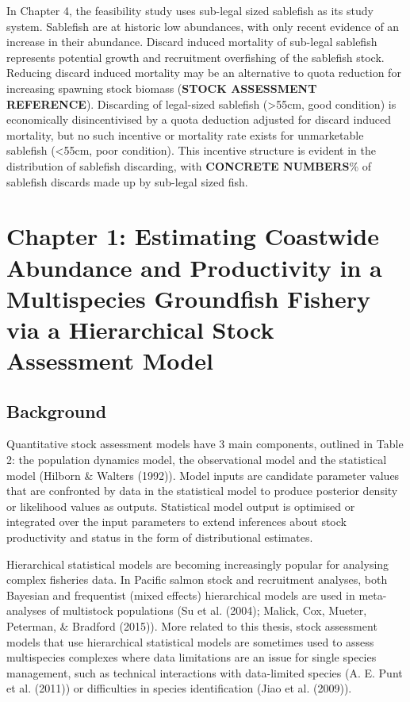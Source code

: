 \documentclass[12pt,]{scrartcl}
\begin{document}
In Chapter 4, the feasibility study uses sub-legal sized sablefish as
its study system. Sablefish are at historic low abundances, with only
recent evidence of an increase in their abundance. Discard induced
mortality of sub-legal sablefish represents potential growth and
recruitment overfishing of the sablefish stock. Reducing discard induced
mortality may be an alternative to quota reduction for increasing
spawning stock biomass (\textbf{STOCK ASSESSMENT REFERENCE}). Discarding
of legal-sized sablefish (\textgreater{}55cm, good condition) is
economically disincentivised by a quota deduction adjusted for discard
induced mortality, but no such incentive or mortality rate exists for
unmarketable sablefish (\textless{}55cm, poor condition). This incentive
structure is evident in the distribution of sablefish discarding, with
\textbf{CONCRETE NUMBERS}\% of sablefish discards made up by sub-legal
sized fish.

\section{Chapter 1: Estimating Coastwide Abundance and Productivity in a
Multispecies Groundfish Fishery via a Hierarchical Stock Assessment
Model}\label{chapter-1-estimating-coastwide-abundance-and-productivity-in-a-multispecies-groundfish-fishery-via-a-hierarchical-stock-assessment-model}

\subsection{Background}\label{background-1}

Quantitative stock assessment models have 3 main components, outlined in
Table 2: the population dynamics model, the observational model and the
statistical model (Hilborn \& Walters (1992)). Model inputs are
candidate parameter values that are confronted by data in the
statistical model to produce posterior density or likelihood values as
outputs. Statistical model output is optimised or integrated over the
input parameters to extend inferences about stock productivity and
status in the form of distributional estimates.

Hierarchical statistical models are becoming increasingly popular for
analysing complex fisheries data. In Pacific salmon stock and
recruitment analyses, both Bayesian and frequentist (mixed effects)
hierarchical models are used in meta-analyses of multistock populations
(Su et al. (2004); Malick, Cox, Mueter, Peterman, \& Bradford (2015)).
More related to this thesis, stock assessment models that use
hierarchical statistical models are sometimes used to assess
multispecies complexes where data limitations are an issue for single
species management, such as technical interactions with data-limited
species (A. E. Punt et al. (2011)) or difficulties in species
identification (Jiao et al. (2009)).
\end{document}
